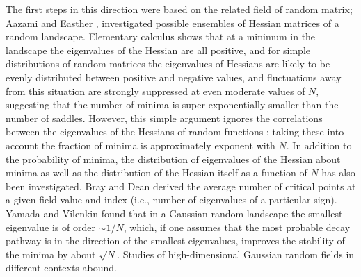 \documentclass[12pt]{article}
\begin{document}
The first steps in this direction were based on the related field of random matrix; Aazami and Easther \cite{Aazami2006}, investigated possible ensembles of Hessian matrices of a random landscape.  Elementary calculus shows that at a minimum in the landscape the eigenvalues of the Hessian are all positive, and for simple distributions of random matrices the eigenvalues of Hessians are likely to be evenly distributed between positive and negative values, and fluctuations away from this situation are strongly suppressed at even moderate values of $N$, suggesting that the number of minima is super-exponentially smaller than the number of saddles. However, this simple argument ignores the correlations between the eigenvalues of the Hessians of random functions \cite{Easther2016}; taking these into account the fraction of minima is approximately exponent with $N$. In addition to the probability of minima, the distribution of eigenvalues of the Hessian about minima as well as the distribution of the Hessian itself as a function of $N$ has also been investigated. Bray and Dean derived the average number of critical points at a given field value and index (i.e., number of eigenvalues of a particular sign).\cite{Bray2007} Yamada and Vilenkin found that in a Gaussian random landscape the smallest eigenvalue is of order $\sim 1/N$, which, if one assumes that the most probable decay pathway is in the direction of the smallest eigenvalues, improves the stability of the minima by about $\sqrt{N}$.\cite{Yamada2018} Studies of high-dimensional Gaussian random fields in different contexts abound.\cite{Dean2008}\cite{Majumdar2009}\cite{Bachlechner2014}\cite{Battefeld2012}\cite{Fyodorov2013}\cite{Masoumi2017}

\end{document}
